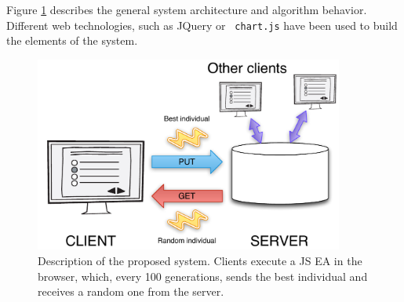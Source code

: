 \documentclass[journal,onecolumn]{IEEEtran}
\begin{document}
Figure \ref{fig:system} describes the general system architecture and
algorithm behavior. Different web technologies, such as JQuery or {\tt
  chart.js} have
been used to build the elements of the system.
\begin{figure}[!t]
\centering
\includegraphics[width=4in]{img/system.pdf}
\caption{Description of the proposed system. Clients execute a JS EA
  in the browser, which, every 100 generations, sends the best
  individual and receives a random one from the server. }
\label{fig:system}
\end{figure}
\end{document}
